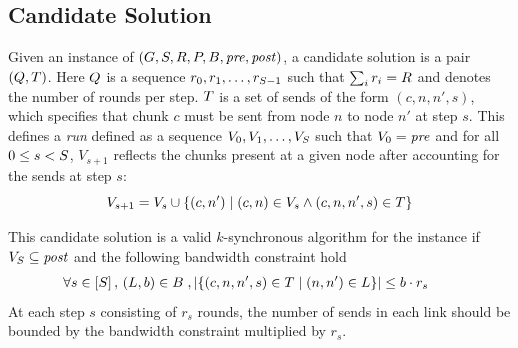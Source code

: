 \subsection{Candidate Solution}
Given an instance of \collectiveproblem
$(G,S,R,P,B,\mathit{pre},\mathit{post})$, a candidate solution
is a pair $(Q,T)$. Here $Q$ is a sequence
$r_0,\allowbreak r_1,\allowbreak \dotsc,\allowbreak r_{S -1}$
such that $\sum_i r_i = R$ and denotes the number of rounds per
step. $T$ is a set of sends of the form $(c,n,n',s)$, which
specifies that chunk $c$ must be sent from node $n$ to node $n'$ at
step $s$. This defines a {\em run} defined as a  sequence
$V_0,V_1,\dotsc,V_{S}$ such that $V_0 = \mathit{pre}$ and for all $0 \leq
s < S$, $V_{s+1}$ reflects the chunks present at a given node
after accounting for the sends at step $s$:
$$ V_{s+1} = V_{s} \cup \{(c,n') \mid (c, n) \in V_{s} \wedge (c, n,
n', s) \in T\} $$

This candidate solution is a valid $k$-synchronous algorithm for the
instance if $V_{S} \subseteq \mathit{post}$ and the following bandwidth
constraint hold
\begin{align*}
    &\begin{aligned}
        \forall &s\in\left[S\right],\,(L,b)\in B \;, |\{(c,n,n',s)\in T \;|\; (n,n')\in L\}|\leq b \cdot r_s
    \end{aligned}
\end{align*}
At each step $s$ consisting of $r_s$ rounds, the number of sends in
each link should be bounded by the bandwidth constraint multiplied by
$r_s$.

